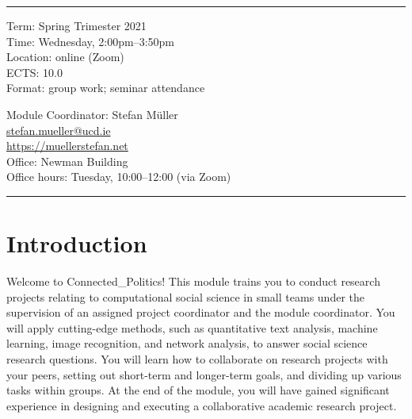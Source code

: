 \documentclass[abstract=on,parskip=full,headings=standardclasses,fontsize=11pt,paper=a4]{scrartcl}
\begin{document}
\vspace{1.5cm}



\hrule
\medskip
\begin{minipage}[t]{0.5\textwidth}
Term: Spring Trimester 2021 \\
Time: Wednesday, 2:00pm--3:50pm \\
Location:  online (Zoom) \\ %
ECTS: 10.0 \\
Format: group work; seminar attendance
\end{minipage}
\begin{minipage}[t]{0.49\textwidth}
\begin{flushright}
Module Coordinator: Stefan Müller \\
 \href{mailto:stefan.mueller@ucd.ie}{\textsf{stefan.mueller@ucd.ie}} \\
 \url{https://muellerstefan.net} \\
Office:  Newman Building \\
Office hours: Tuesday, 10:00--12:00 (via Zoom)
\end{flushright}
\end{minipage}
\medskip
\hrule 

\section*{Introduction}


Welcome to Connected\_Politics! This module trains you to conduct research projects relating to computational social science in small teams under the supervision of an assigned project coordinator and the module coordinator. You will apply cutting-edge methods, such as quantitative text analysis, machine learning, image recognition, and network analysis, to answer social science research questions. You will learn how to collaborate on research projects with your peers, setting out short-term and longer-term goals, and dividing up various tasks within  groups. At the end of the module, you will have gained significant experience in designing and executing a collaborative academic research project.
\end{document}
